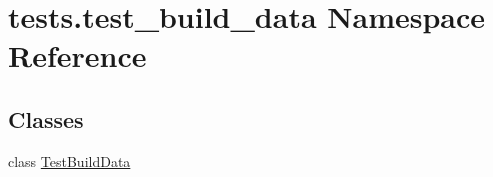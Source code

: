\hypertarget{namespacetests_1_1test__build__data}{}\section{tests.\+test\+\_\+build\+\_\+data Namespace Reference}
\label{namespacetests_1_1test__build__data}
\subsection*{Classes}
\begin{DoxyCompactItemize}
\item 
class \hyperlink{classtests_1_1test__build__data_1_1TestBuildData}{Test\+Build\+Data}
\end{DoxyCompactItemize}
